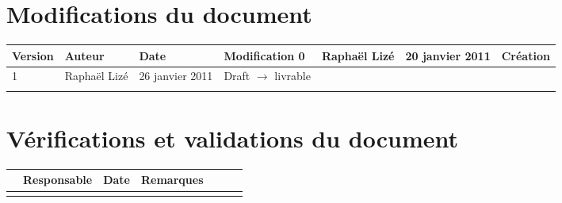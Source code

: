 
\section*{Modifications du document}

\begin{center}
\begin{longtable}{|m{14mm}||m{36mm}|m{36mm}|m{60mm}|}
\hline
Version & Auteur & Date & Modification\endhead \hline
0
& %
Raphaël Lizé
& %
20 janvier 2011
& %
Création
\\\hline
1
& %
Raphaël Lizé
& %
26 janvier 2011
& %
Draft $\rightarrow$ livrable
\\\hline

& %

& %

& %

\\\hline
\end{longtable}
\end{center}


\section*{Vérifications et validations du document}

\begin{center}
\begin{longtable}{|m{15mm}|m{36mm}|m{36mm}|m{60mm}|}
\hline
 & Responsable & Date & Remarques\endhead \hline

& %

& %

& %

\\\hline

& %

& %

& %

\\\hline
\end{longtable}
\end{center}

\pagebreak
